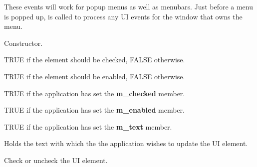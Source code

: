 These events will work for popup menus as well as menubars. Just before a menu is popped
up,  is called to process any UI events for
the window that owns the menu.






Constructor.



TRUE if the element should be checked, FALSE otherwise.



TRUE if the element should be enabled, FALSE otherwise.



TRUE if the application has set the {\bf m\_checked} member.



TRUE if the application has set the {\bf m\_enabled} member.



TRUE if the application has set the {\bf m\_text} member.



Holds the text with which the the application wishes to
update the UI element.

\label{wxupdateuieventcheck}


Check or uncheck the UI element.

\label{wxupdateuieventenable}

